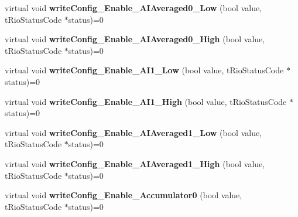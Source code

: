 \begin{DoxyCompactItemize}
\item 
\hypertarget{classnFPGA_1_1nFRC__2012__1__6__4_1_1tDMA_a9738afad5d525049a238827db3a305cf}{
virtual void {\bfseries writeConfig\_\-Enable\_\-AIAveraged0\_\-Low} (bool value, tRioStatusCode $\ast$status)=0}
\label{classnFPGA_1_1nFRC__2012__1__6__4_1_1tDMA_a9738afad5d525049a238827db3a305cf}

\item 
\hypertarget{classnFPGA_1_1nFRC__2012__1__6__4_1_1tDMA_a4317a070e4d837f221ce7bf8cadffefa}{
virtual void {\bfseries writeConfig\_\-Enable\_\-AIAveraged0\_\-High} (bool value, tRioStatusCode $\ast$status)=0}
\label{classnFPGA_1_1nFRC__2012__1__6__4_1_1tDMA_a4317a070e4d837f221ce7bf8cadffefa}

\item 
\hypertarget{classnFPGA_1_1nFRC__2012__1__6__4_1_1tDMA_a6a7455ae3af7e30f3b3f9a81b70a4861}{
virtual void {\bfseries writeConfig\_\-Enable\_\-AI1\_\-Low} (bool value, tRioStatusCode $\ast$status)=0}
\label{classnFPGA_1_1nFRC__2012__1__6__4_1_1tDMA_a6a7455ae3af7e30f3b3f9a81b70a4861}

\item 
\hypertarget{classnFPGA_1_1nFRC__2012__1__6__4_1_1tDMA_af47023dd0e892aefb9c530ab893a25ad}{
virtual void {\bfseries writeConfig\_\-Enable\_\-AI1\_\-High} (bool value, tRioStatusCode $\ast$status)=0}
\label{classnFPGA_1_1nFRC__2012__1__6__4_1_1tDMA_af47023dd0e892aefb9c530ab893a25ad}

\item 
\hypertarget{classnFPGA_1_1nFRC__2012__1__6__4_1_1tDMA_adc11d0ca653e0a6525009b0f638c59c9}{
virtual void {\bfseries writeConfig\_\-Enable\_\-AIAveraged1\_\-Low} (bool value, tRioStatusCode $\ast$status)=0}
\label{classnFPGA_1_1nFRC__2012__1__6__4_1_1tDMA_adc11d0ca653e0a6525009b0f638c59c9}

\item 
\hypertarget{classnFPGA_1_1nFRC__2012__1__6__4_1_1tDMA_abf794c45215ceb3d3c0b1272dd5d2c59}{
virtual void {\bfseries writeConfig\_\-Enable\_\-AIAveraged1\_\-High} (bool value, tRioStatusCode $\ast$status)=0}
\label{classnFPGA_1_1nFRC__2012__1__6__4_1_1tDMA_abf794c45215ceb3d3c0b1272dd5d2c59}

\item 
\hypertarget{classnFPGA_1_1nFRC__2012__1__6__4_1_1tDMA_a48c31f556556362692b4b0cdad353910}{
virtual void {\bfseries writeConfig\_\-Enable\_\-Accumulator0} (bool value, tRioStatusCode $\ast$status)=0}
\label{classnFPGA_1_1nFRC__2012__1__6__4_1_1tDMA_a48c31f556556362692b4b0cdad353910}


\end{DoxyCompactItemize}
